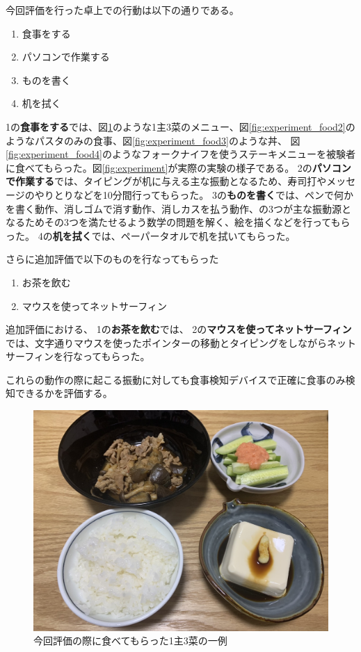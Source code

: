 今回評価を行った卓上での行動は以下の通りである。

\begin{enumerate}
  \item 食事をする
  \item パソコンで作業する
  \item ものを書く
  \item 机を拭く
\end{enumerate}

1の\textbf{食事をする}では、図\ref{fig:experiment_food1}のような1主3菜のメニュー、図\ref{fig:experiment_food2}のようなパスタのみの食事、図\ref{fig:experiment_food3}のような丼、
図\ref{fig:experiment_food4}のようなフォークナイフを使うステーキメニューを被験者に食べてもらった。図\ref{fig:experiment}が実際の実験の様子である。
2の\textbf{パソコンで作業する}では、タイピングが机に与える主な振動となるため、寿司打\cite{sushida}やメッセージのやりとりなどを10分間行ってもらった。
3の\textbf{ものを書く}では、ペンで何かを書く動作、消しゴムで消す動作、消しカスを払う動作、の3つが主な振動源となるためその3つを満たせるよう数学の問題を解く、絵を描くなどを行ってもらった。
4の\textbf{机を拭く}では、ペーパータオルで机を拭いてもらった。

さらに追加評価で以下のものを行なってもらった

\begin{enumerate}
  \item お茶を飲む
  \item マウスを使ってネットサーフィン
\end{enumerate}

追加評価における、
1の\textbf{お茶を飲む}では、
2の\textbf{マウスを使ってネットサーフィン}では、文字通りマウスを使ったポインターの移動とタイピングをしながらネットサーフィンを行なってもらった。

これらの動作の際に起こる振動に対しても食事検知デバイスで正確に食事のみ検知できるかを評価する。

\begin{figure}[htbp]
  \caption{今回評価の際に食べてもらった1主3菜の一例}
  \label{fig:experiment_food1}
  \begin{center}
    \includegraphics[bb=0 0 1450 1200,width=15cm]{assets/experiment_food1.jpg}
  \end{center}
\end{figure}

